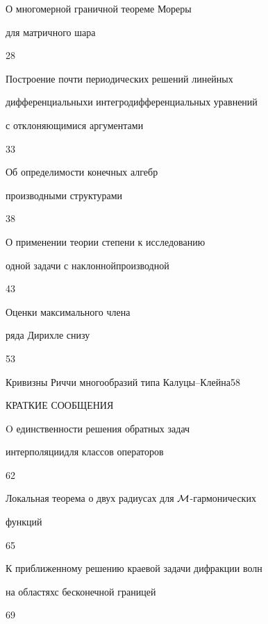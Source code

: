 {О многомерной граничной теореме Мореры


для матричного шара}{28}




{Построение почти периодических решений линейных 


дифференциальных\newline и интегродифференциальных уравнений 


с отклоняющимися аргументами}{33}




{Об определимости конечных алгебр


производными структурами}{38}




{О применении теории степени к исследованию


одной задачи с наклонной\newline производной}{43}




{Оценки максимального члена


ряда Дирихле снизу}{53}




{Кривизны Риччи многообразий типа Калуцы--Клейна}{58}





\bigskip





\begin{center}


КРАТКИЕ СООБЩЕНИЯ


\end{center}


\bigskip







{O единственности решения обратных задач


интерполяции\newline для классов операторов}{62}




{Локальная теорема о двух радиусах для $\cal M$-гармонических 


функций}{65}




{К приближенному решению краевой задачи дифракции волн


на областях\newline с бесконечной границей}{69}


